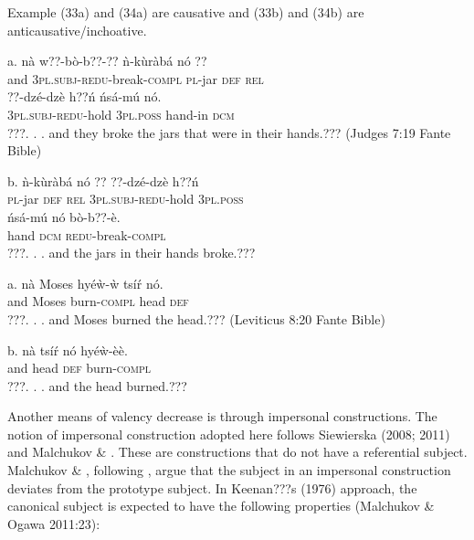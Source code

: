 \documentclass[output=paper]{langsci/langscibook}
\begin{document}
Example (33a) and (34a) are causative and (33b) and (34b) are anticausative/inchoative.

\ea
\gll a.  nà  w??-bò-b??-??       ǹ-k\`{u}ràbá   nó  ?? \\
       and  \textsc{3pl.subj}{}-\textsc{redu}{}-break\textsc{{}-compl}  \textsc{pl}{}-jar    \textsc{def}  \textsc{rel}  \\
\gll   ??{}-dzé-dzè    h??ń    ńsá-mú    nó.   \\
             \textsc{3pl.subj}{}-\textsc{redu}{}-hold  \textsc{3pl.poss}  hand-in  \textsc{dcm}\\
\glt ???. . .  and they broke the jars that were in their hands.??? (Judges 7:19 Fante Bible)
\z

\ea
\gll  b.  ǹ-k\`{u}ràbá   nó  ??  ??{}-dzé-dzè    h??ń  \\
       \textsc{pl}{}-jar    \textsc{def}  \textsc{rel}  \textsc{3pl.subj}{}-\textsc{redu}{}-hold  \textsc{3pl.poss}\\
\gll   ńsá-mú    nó    bò-b??-è.\\
       hand    \textsc{dcm}    \textsc{redu}{}-break-\textsc{compl}\\
\glt ???. . .  and the jars in their hands broke.???
\z

\ea
\gll a.  nà  Moses    hyéẁ-ẁ   tsí\'{r}  nó.\\
       and   Moses     burn-\textsc{compl}  head  \textsc{def}\\
\glt ???. . .  and Moses burned the head.??? (Leviticus 8:20 Fante Bible)
\z

\ea
\gll  b.  nà  tsí\'{r}   nó  hyéẁ-èè.\\
       and  head  \textsc{def}  burn-\textsc{compl}  \\
\glt ???. .  . and the head burned.???
\z


Another means of valency decrease is through impersonal constructions. The notion of impersonal construction adopted here follows Siewierska (2008; 2011) and Malchukov \& \citet{Ogawa2011}. These are constructions that do not have a referential subject. Malchukov \& \citet{Ogawa2011}, following \citet{Keenan1976}, argue that the subject in an impersonal construction deviates from the prototype subject. In Keenan???s (1976) approach, the canonical subject is expected to have the following properties (Malchukov \& Ogawa 2011:23):
\end{document}
